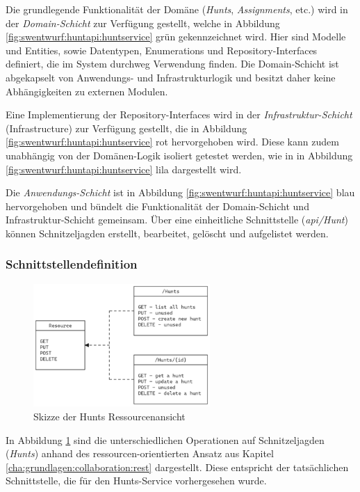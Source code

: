 Die grundlegende Funktionalität der Domäne (\textit{Hunts}, \textit{Assignments}, etc.) wird in der \textit{Domain-Schicht} zur Verfügung gestellt, welche in Abbildung \ref{fig:swentwurf:huntapi:huntservice} grün gekennzeichnet wird. Hier sind Modelle und Entities, sowie Datentypen, Enumerations und Repository-Interfaces definiert, die im System durchweg Verwendung finden. Die Domain-Schicht ist abgekapselt von Anwendungs- und Infrastrukturlogik und besitzt daher keine Abhängigkeiten zu externen Modulen.

Eine Implementierung der Repository-Interfaces wird in der \textit{Infrastruktur-Schicht} (Infrastructure) zur Verfügung gestellt, die in Abbildung \ref{fig:swentwurf:huntapi:huntservice} rot hervorgehoben wird. Diese kann zudem unabhängig von der Domänen-Logik isoliert getestet werden, wie in in Abbildung \ref{fig:swentwurf:huntapi:huntservice} lila dargestellt wird.

Die \textit{Anwendungs-Schicht} ist in Abbildung \ref{fig:swentwurf:huntapi:huntservice} blau hervorgehoben und bündelt die Funktionalität der Domain-Schicht und Infrastruktur-Schicht gemeinsam. Über eine einheitliche Schnittstelle (\textit{api/Hunt}) können Schnitzeljagden erstellt, bearbeitet, gelöscht und aufgelistet werden.

\subsubsection{Schnittstellendefinition}

\begin{figure}[H]
    \centering
    \includegraphics[width=0.6\textwidth]{images/PrAr-Software-Entwurf-Hunt-Api-Hunt-Service-Endpoints.png}
    \caption{Skizze der Hunts Ressourcenansicht}
    \label{fig:swentwurf:huntapi:huntservice:endpoints}
\end{figure}

In Abbildung \ref{fig:swentwurf:huntapi:huntservice:endpoints} sind die unterschiedlichen Operationen auf Schnitzeljagden (\textit{Hunts}) anhand des ressourcen-orientierten Ansatz aus Kapitel \ref{cha:grundlagen:collaboration:rest} dargestellt. Diese entspricht der tatsächlichen Schnittstelle, die für den Hunts-Service vorhergesehen wurde.

